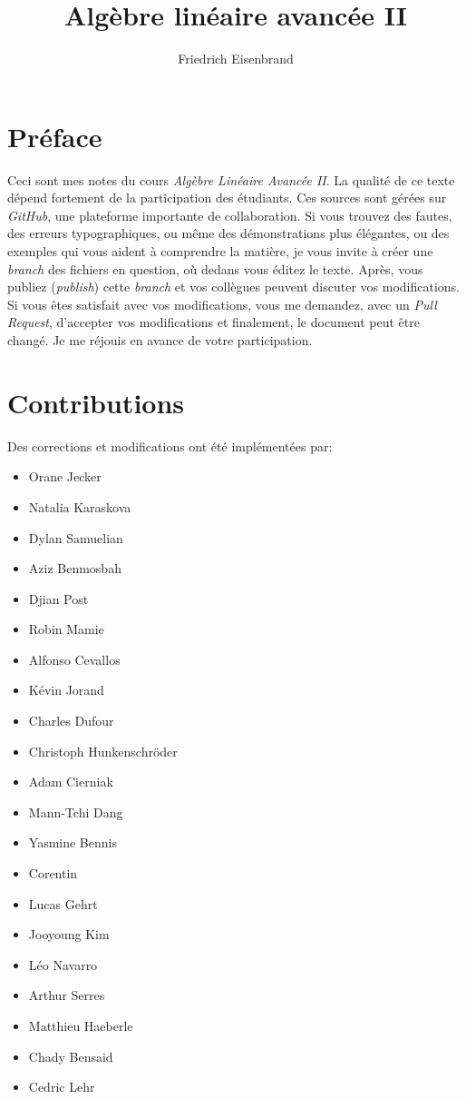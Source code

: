 \documentclass[a4paper,11pt,french]{scrbook}
\title{Algèbre linéaire avancée II}
\author{Friedrich Eisenbrand}
\theoremstyle{plain}
\theoremstyle{definition}
\begin{document}
\maketitle
  
\section*{Préface}
\noindent Ceci sont mes notes du cours \emph{Algèbre Linéaire Avancée II}.
La qualité de ce texte dépend fortement de la participation  des étudiants. 
Ces  sources sont gérées sur \emph{GitHub}, une plateforme importante de collaboration. Si vous trouvez des fautes, des erreurs typographiques, ou même des démonstrations plus élégantes, ou des exemples qui vous aident à comprendre la matière, je vous invite à créer une \emph{branch} des fichiers en question, où dedans vous éditez le texte. Après, vous publiez (\emph{publish}) cette \emph{branch} et vos collègues peuvent discuter vos modifications. Si vous êtes satisfait avec vos modifications, vous me demandez, avec un \emph{Pull Request}, d'accepter vos modifications et finalement, le document peut être changé. Je me réjouis en avance de votre participation. 

  
\section*{Contributions}

Des corrections et modifications ont été implémentées par: 
\begin{itemize}
\item Orane Jecker 
\item Natalia Karaskova
\item Dylan Samuelian
\item Aziz Benmosbah
\item Djian Post
\item Robin Mamie
\item Alfonso Cevallos
\item Kévin Jorand
\item Charles Dufour 
\item Christoph Hunkenschröder
\item Adam Cierniak
\item Mann-Tchi Dang
\item Yasmine Bennis
\item Corentin 
\item Lucas Gehrt
\item Jooyoung Kim 
\item Léo Navarro
\item Arthur Serres
\item Matthieu Haeberle
\item Chady Bensaid
\item Cedric Lehr
\end{itemize}
\end{document}
